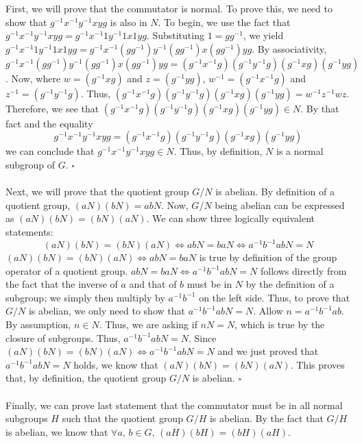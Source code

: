 \documentclass[letterpaper]{article}
\newcommand*{\QED}{\hfill\ensuremath{\square}}%
\begin{document}
First, we will prove that the commutator is normal.
To prove this, we need to show that $ g^{-1} x^{-1} y^{-1} x y g $ is also in $ N $.
To begin, we use the fact that $ g^{-1} x^{-1} y^{-1} x y g = g^{-1} x^{-1} 1 y^{-1} 1 x 1 y g $.
Substituting $ 1 = g g^{-1} $, we yield $ g^{-1} x^{-1} 1 y^{-1} 1 x 1 y g = g^{-1} x^{-1} (g g^{-1}) y^{-1} (g g^{-1}) x (g g^{-1}) y g $.
By associativity, $ g^{-1} x^{-1} (g g^{-1}) y^{-1} (g g^{-1}) x (g g^{-1}) y g = (g^{-1} x^{-1} g) (g^{-1} y^{-1} g) (g^{-1} x g) (g^{-1} y g) $.
Now, where $ w = (g^{-1} x g) $ and $ z = (g^{-1} y g) $, $ w^{-1} = (g^{-1} x^{-1} g) $ and $ z^{-1} = (g^{-1} y^{-1} g) $.
Thus, $ (g^{-1} x^{-1} g) (g^{-1} y^{-1} g) (g^{-1} x g) (g^{-1} y g) = w^{-1} z^{-1} w z $.
Therefore, we see that $ (g^{-1} x^{-1} g) (g^{-1} y^{-1} g) (g^{-1} x g) (g^{-1} y g) \in N $.
By that fact and the equality
$$ g^{-1} x^{-1} y^{-1} x y g = (g^{-1} x^{-1} g) (g^{-1} y^{-1} g) (g^{-1} x g) (g^{-1} y g) $$
we can conclude that $ g^{-1} x^{-1} y^{-1} x y g \in N $.
Thus, by definition, $ N $ is a normal subgroup of $ G $.
\QED{}
\\ \\
Next, we will prove that the quotient group $ G / N $ is abelian.
By definition of a quotient group, $ (aN)(bN) = abN $.
Now, $ G / N $ being abelian can be expressed as $ (aN)(bN) = (bN)(aN) $.
We can show three logically equivalent statements:
$$ (aN)(bN) = (bN)(aN) \iff abN = baN \iff a^{-1}b^{-1}abN = N $$
$ (aN)(bN) = (bN)(aN) \iff abN = baN $ is true by definition of the group operator of a quotient group.
$ abN = baN \iff a^{-1}b^{-1}abN = N $ follows directly from the fact that the inverse of $ a $ and that of $ b $ must be in $ N $ by the definition of a subgroup; we simply then multiply by $ a^{-1}b^{-1} $ on the left side.
Thus, to prove that $ G / N $ is abelian, we only need to show that $ a^{-1}b^{-1}abN = N $.
Allow $ n = a^{-1}b^{-1}ab $.
By assumption, $ n \in N $.
Thus, we are asking if $ nN = N $, which is true by the closure of subgroups.
Thus, $ a^{-1}b^{-1}abN = N $.
Since $ (aN)(bN) = (bN)(aN) \iff a^{-1}b^{-1}abN = N $ and we just proved that $ a^{-1}b^{-1}abN = N $ holds, we know that $ (aN)(bN) = (bN)(aN) $.
This proves that, by definition, the quotient group $ G / N $ is abelian.
\QED{}
\\ \\
Finally, we can prove last statement that the commutator must be in all normal subgroups $ H $ such that the quotient group $ G / H $ is abelian.
By the fact that $ G / H $ is abelian, we know that $ \forall a,\,b \in G, \, (aH)(bH) = (bH)(aH) $.
\end{document}
